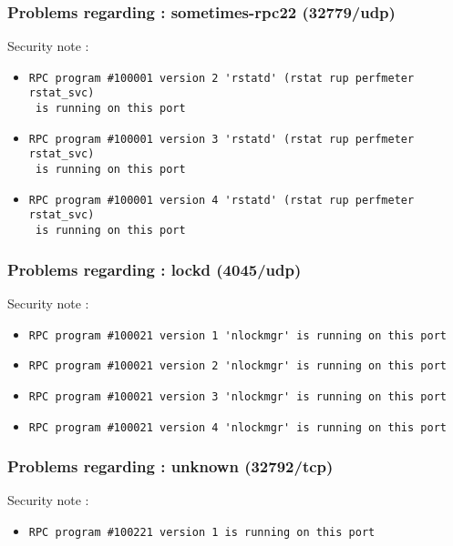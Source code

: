 \documentclass{article}
\begin{document}
\subsubsection{Problems regarding : sometimes-rpc22 (32779/udp)}
Security note :\\
\begin{itemize}
\item \begin{verbatim}
RPC program #100001 version 2 'rstatd' (rstat rup perfmeter rstat_svc)
 is running on this port
\end{verbatim}\item \begin{verbatim}
RPC program #100001 version 3 'rstatd' (rstat rup perfmeter rstat_svc)
 is running on this port
\end{verbatim}\item \begin{verbatim}
RPC program #100001 version 4 'rstatd' (rstat rup perfmeter rstat_svc)
 is running on this port
\end{verbatim}\end{itemize}
\subsubsection{Problems regarding : lockd (4045/udp)}
Security note :\\
\begin{itemize}
\item \begin{verbatim}
RPC program #100021 version 1 'nlockmgr' is running on this port
\end{verbatim}\item \begin{verbatim}
RPC program #100021 version 2 'nlockmgr' is running on this port
\end{verbatim}\item \begin{verbatim}
RPC program #100021 version 3 'nlockmgr' is running on this port
\end{verbatim}\item \begin{verbatim}
RPC program #100021 version 4 'nlockmgr' is running on this port
\end{verbatim}\end{itemize}
\subsubsection{Problems regarding : unknown (32792/tcp)}
Security note :\\
\begin{itemize}
\item \begin{verbatim}
RPC program #100221 version 1 is running on this port
\end{verbatim}\end{itemize}
\end{document}

